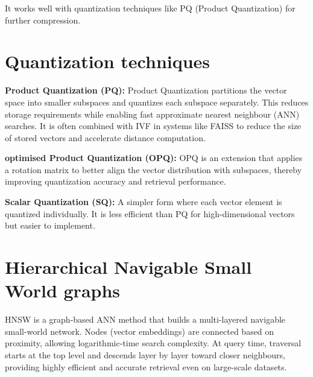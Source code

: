 \documentclass[12pt,twoside]{report}
\begin{document}
It works well with quantization techniques like PQ (Product Quantization) for further compression.

\section{Quantization techniques}
\label{appendix:quantizationTechniques}
\textbf{Product Quantization (PQ):}
Product Quantization partitions the vector space into smaller subspaces and quantizes each subspace separately. This reduces storage requirements while enabling fast approximate nearest neighbour (ANN) searches. It is often combined with IVF in systems like FAISS to reduce the size of stored vectors and accelerate distance computation.

\textbf{optimised Product Quantization (OPQ):}
OPQ is an extension that applies a rotation matrix to better align the vector distribution with subspaces, thereby improving quantization accuracy and retrieval performance.

\textbf{Scalar Quantization (SQ):}
A simpler form where each vector element is quantized individually. It is less efficient than PQ for high-dimensional vectors but easier to implement.

\section{Hierarchical Navigable Small World graphs}
\label{appendix:HNSW}
HNSW is a graph-based ANN method that builds a multi-layered navigable small-world network. Nodes (vector embeddings) are connected based on proximity, allowing logarithmic-time search complexity. At query time, traversal starts at the top level and descends layer by layer toward closer neighbours, providing highly efficient and accurate retrieval even on large-scale datasets.
\end{document}
